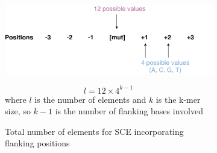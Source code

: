 \begin{figure}[ht!]
  \vspace{1cm}
  \begin{subfigure}{\textwidth}
  \begin{minipage}{0.65\textwidth}
    \includegraphics[width=\textwidth]{graphics/sce_counts_demo.pdf}
  \end{minipage}
  \begin{minipage}{0.3\textwidth}
    \begin{equation}
    l = 12 \times 4^{k-1}
    \label{eq:sce_counts}
    \end{equation}
    where $l$ is the number of elements and $k$ is the k-mer size, so $k-1$ is the number of flanking bases involved
  \end{minipage}
    \caption{Total number of elements for SCE incorporating flanking positions}\label{fig:sce_size}
  \end{subfigure} \\
  \vspace{0.2cm}
  \caption{
} \label{fig:sce_counts}
\end{figure}
